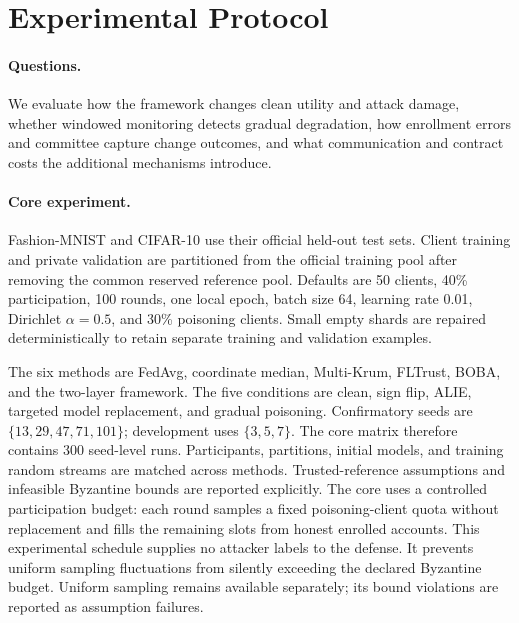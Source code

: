 \section{Experimental Protocol}
\label{sec:evaluation}
\paragraph{Questions.}
We evaluate how the framework changes clean utility and attack damage, whether
windowed monitoring detects gradual degradation, how enrollment errors and
committee capture change outcomes, and what communication and contract costs
the additional mechanisms introduce.

\paragraph{Core experiment.}
Fashion-MNIST and CIFAR-10 use their official held-out test sets. Client training
and private validation are partitioned from the official training pool after
removing the common reserved reference pool. Defaults are 50 clients, 40\%
participation, 100 rounds, one local epoch, batch size 64, learning rate 0.01,
Dirichlet $\alpha=0.5$, and 30\% poisoning clients. Small empty shards are repaired
deterministically to retain separate training and validation examples.

The six methods are FedAvg, coordinate median, Multi-Krum, FLTrust, BOBA, and the
two-layer framework. The five conditions are clean, sign flip, ALIE, targeted
model replacement, and gradual poisoning. Confirmatory seeds are
$\{13,29,47,71,101\}$; development uses $\{3,5,7\}$. The core matrix therefore
contains 300 seed-level runs. Participants, partitions, initial models, and
training random streams are matched across methods. Trusted-reference assumptions
and infeasible Byzantine bounds are reported explicitly.
The core uses a controlled participation budget: each round samples a fixed
poisoning-client quota without replacement and fills the remaining slots from
honest enrolled accounts. This experimental schedule supplies no attacker labels
to the defense. It prevents uniform sampling fluctuations from silently exceeding
the declared Byzantine budget. Uniform sampling remains available separately;
its bound violations are reported as assumption failures.

